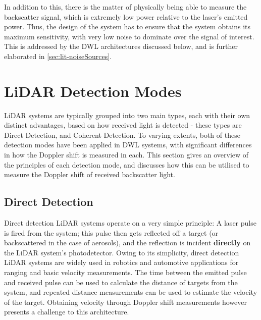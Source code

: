     In addition to this, there is the matter of physically being able to measure the backscatter signal, which is extremely low power relative to the laser's emitted power. Thus, the design of the system has to ensure that the system obtains its maximum sensitivity, with very low noise to dominate over the signal of interest. This is addressed by the DWL architectures discussed below, and is further elaborated in \autoref{sec:lit-noiseSources}.

        
    
    \section{LiDAR Detection Modes}
    LiDAR systems are typically grouped into two main types, each with their own distinct advantages, based on how received light is detected - these types are Direct Detection, and Coherent Detection. To varying extents, both of these detection modes have been applied in DWL systems, with significant differences in how the Doppler shift is measured in each. This section gives an overview of the principles of each detection mode, and discusses how this can be utilised to measure the Doppler shift of received backscatter light. 
    
    
        \subsection{Direct Detection}
        \label{sec:lit-directDetection}
        Direct detection LiDAR systems operate on a very simple principle: A laser pulse is fired from the system; this pulse then gets reflected off a target (or backscattered in the case of aerosols), and the reflection is incident \textbf{directly} on the LiDAR system's photodetector. Owing to its simplicity, direct detection LiDAR systems are widely used in robotics and automotive applications for ranging and basic velocity measurements. The time between the emitted pulse and received pulse can be used to calculate the distance of targets from the system, and repeated distance measurements can be used to estimate the velocity of the target. Obtaining velocity through Doppler shift measurements however presents a challenge to this architecture.
        
